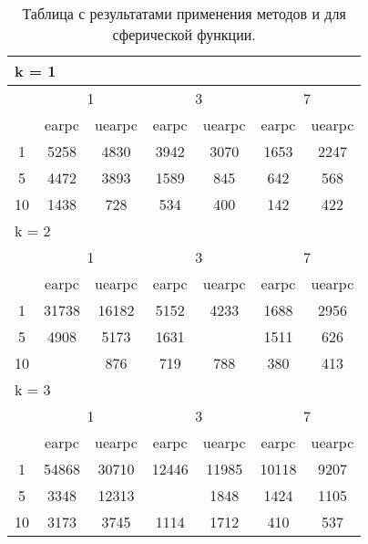 \begin{table}
  \centering
  \begin{tabular}{|*7{c|}}
    \hline
    \multicolumn{7}{|l|}{k = 1} \\
    \hline
    \multirow{2}{*}{\diagbox{$\mu$}{$\lambda$}} & \multicolumn{2}{c|}{1} & \multicolumn{2}{c|}{3} & \multicolumn{2}{c|}{7} \\
    \cline{2-7}
    & earpc & uearpc & earpc & uearpc & earpc & uearpc \\
    \hline
    1 & 5258 & 4830 & 3942 & 3070 & 1653 & 2247 \\
    \hline
    5 & 4472 & 3893 & 1589 & 845 & 642& 568 \\
    \hline
    10 & 1438 & 728 & 534 & 400& 142 & 422 \\
    \hline
    \multicolumn{7}{|l|}{k = 2} \\
    \hline
    \multirow{2}{*}{\diagbox{$\mu$}{$\lambda$}} & \multicolumn{2}{c|}{1} & \multicolumn{2}{c|}{3} & \multicolumn{2}{c|}{7} \\
    \cline{2-7}
    & earpc & uearpc & earpc & uearpc & earpc & uearpc \\
    \hline
    1 & 31738 & 16182 & 5152 & 4233 & 1688 & 2956 \\
    \hline
    5 & 4908 & 5173 & 1631& \cellcolor{olive}{946} & 1511 & 626 \\
    \hline
    10& \cellcolor{olive}{778} & 876 & 719 & 788 & 380 & 413 \\
    \hline
    \multicolumn{7}{|l|}{k = 3} \\
    \hline
    \multirow{2}{*}{\diagbox{$\mu$}{$\lambda$}} & \multicolumn{2}{c|}{1} & \multicolumn{2}{c|}{3} & \multicolumn{2}{c|}{7} \\
    \cline{2-7}
    & earpc & uearpc & earpc & uearpc & earpc & uearpc \\
    \hline
    1 & 54868 & 30710 & 12446 & 11985 & 10118 & 9207 \\
    \hline
    5 & 3348 & 12313& \cellcolor{olive}{1379} & 1848 & 1424 & 1105 \\
    \hline
    10 & 3173 & 3745 & 1114 & 1712 & 410 & 537 \\
    \hline
  \end{tabular}
  \captionsetup{justification=centering}
  \caption{Таблица с результатами применения методов  и  для сферической функции.}
  \label{earpc_sphere_results}
\end{table}

